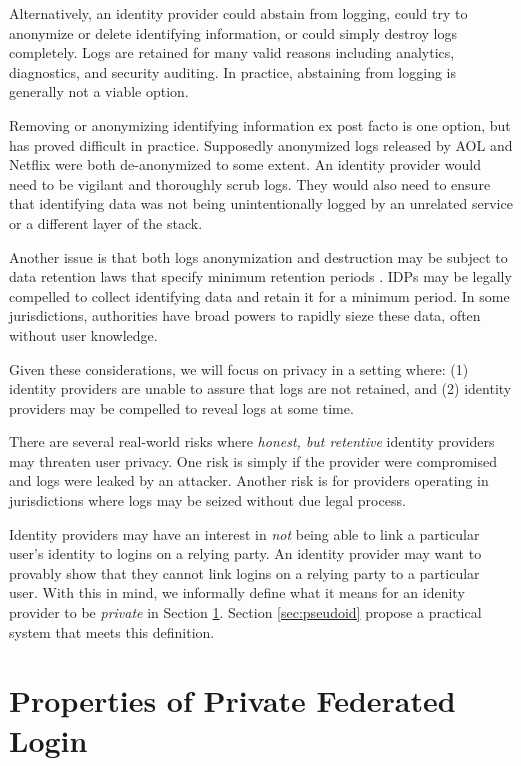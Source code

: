 \documentclass{llncs}
\begin{document}
Alternatively, an identity provider could abstain from logging, could
try to anonymize or delete identifying information, or could simply
destroy logs completely. Logs are retained for many valid reasons
including analytics, diagnostics, and security auditing. In practice,
abstaining from logging is generally not a viable option.

Removing or anonymizing identifying information ex post facto is one
option, but has proved difficult in practice. Supposedly anonymized
logs released by AOL \cite{BarZel06} and Netflix \cite{NaSh08} were
both de-anonymized to some extent. An identity provider would need to
be vigilant and thoroughly scrub logs. They would also need to ensure
that identifying data was not being unintentionally logged by an
unrelated service or a different layer of the stack.

Another issue is that both logs anonymization and destruction may be
subject to data retention laws that specify minimum retention periods
\cite{EUDir}. IDPs may be legally compelled to collect identifying
data and retain it for a minimum period. In some jurisdictions,
authorities have broad powers to rapidly sieze these data, often
without user knowledge.

Given these considerations, we will focus on privacy in a setting where:
(1) identity providers are unable to assure that logs are not retained, and
(2) identity providers may be compelled to reveal logs at some time.

There are several real-world risks where \emph{honest, but retentive}
identity providers may threaten user privacy. One risk is simply if
the provider were compromised and logs were leaked by an
attacker. Another risk is for providers operating in jurisdictions
where logs may be seized without due legal process. 

Identity providers may have an interest in \emph{not} being able to
link a particular user's identity to logins on a relying party. An
identity provider may want to provably show that they cannot link
logins on a relying party to a particular user. With this in mind, we
informally define what it means for an idenity provider to be
\emph{private} in Section \ref{sec:private-fed-login}. Section
\ref{sec:pseudoid} propose a practical system that meets this
definition.

\section{Properties of Private Federated Login}
\label{sec:private-fed-login}
\end{document}
